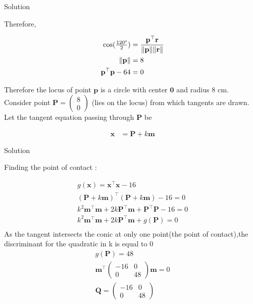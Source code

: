 \documentclass{beamer}
\numberwithin{equation}{section}
\theoremstyle{remark}
\providecommand{\norm}[1]{\lVert#1\rVert}
\newcommand{\myvec}[1]{\ensuremath{\begin{pmatrix}#1\end{pmatrix}}}
\let\vec\mathbf
\begin{document}
	\begin{frame}{Solution}
		
		
		Therefore,
		
		\begin{align}
			\cos(\tfrac{120\degree}{2}) &= \frac{\vec{p}^\top\vec{r}}{\norm{\vec{p}}\norm{\vec{r}}}\\
			\norm{\vec{p}} &= 8\\
			\vec{p}^\top\vec{p} - 64 &= 0
		\end{align}
		
		Therefore the locus of point $\vec{p}$ is a circle with center $\vec{0}$ and radius 8 cm.\\
		
		Consider point $\vec{P} = \myvec{8\\0}$ (lies on the locus) from which tangents are drawn.\\
		
		Let the tangent equation passing through $\vec{P}$ be 
		
		\begin{align}
			\vec{x} &= \vec{P} + k\vec{m}
		\end{align}
		
	\end{frame}
	
	\begin{frame}{Solution}
		
		Finding the point of contact :
		
		\begin{align}
			g(\vec{x}) = \vec{x}^\top\vec{x} - 16 \label{eq:circle}\\
			(\vec{P}+k\vec{m})^\top(\vec{P}+k\vec{m}) - 16 = 0\\
			k^2\vec{m}^\top\vec{m} + 2k\vec{P}^\top\vec{m} + \vec{P}^\top\vec{P} - 16 = 0\\
			k^2\vec{m}^\top\vec{m} + 2k\vec{P}^\top\vec{m} + g(\vec{P}) = 0\\
		\end{align}
		As the tangent intersects the conic at only one point(the point of contact),the discriminant for the quadratic in k is equal to 0
		\begin{align}
			g(\vec{P}) = 48\\
			\vec{m}^\top\myvec{-16 & 0\\0 & 48}\vec{m} = 0 \label{eq:mqm} \\
			\vec{Q} = \myvec{-16 & 0\\0 & 48}\\ 
		\end{align}
		
	\end{frame}
	
\end{document}
